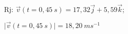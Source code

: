 
Rj: $\vec{v}(t=0,45\ s)=17,32\vec{j}+5,59\vec{k} $;

$\lvert\vec{v}(t=0,45\ s)\rvert=18,20\ ms^{-1}$

